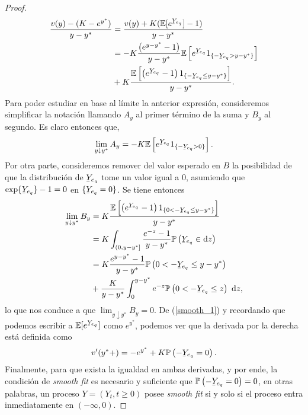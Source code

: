 \begin{proof}
\begin{align}
\frac{v(y) - (K - e^{y^{*}})}{y - y^{*}} & = \frac{v(y) + K(\mathbb{E}[e^{\ubar{Y}_{e_q}}] - 1)}{y - y^{*}} \nonumber \\
	& = - K \frac{\left( e^{y - y^{*}} - 1 \right)}{y - y^{*}} \mathbb{E} \left[ e^{\ubar{Y}_{e_q}} 1_{\{ - \ubar{Y}_{e_q} > y - y^{*}\}} \right] \nonumber \\ 
	& + K \frac{\mathbb{E} \left[ \left( e^{\ubar{Y}_{e_q}} - 1  \right) 1_{\{ - \ubar{Y}_{e_q} \leq y - y^{*}\}} \right]}{y - y^{*}}. \label{smooth_1}
\end{align}
Para poder estudiar en base al límite la anterior expresión, consideremos simplificar la notación llamando $A_y$ al primer término de la suma y $B_y$ al segundo. Es claro entonces que, 
\begin{align*}
\lim_{y \downarrow y^{*}} A_y = - K \mathbb{E} \left[ e^{\ubar{Y}_{e_q}} 1_{\{ - \ubar{Y}_{e_q} > 0\}} \right].
\end{align*}
Por otra parte, consideremos remover del valor esperado en $B$ la posibilidad de que la distribución de $\ubar{Y}_{e_q}$ tome un valor igual a $0$, asumiendo que $\exp \{ \ubar{Y}_{e_q} \} -  1 = 0$ en $\{ \ubar{Y}_{e_q} = 0 \}$. Se tiene entonces
\begin{align*}
\lim_{y \downarrow y^{*}} B_y & = K \frac{\mathbb{E} \left[ \left( e^{\ubar{Y}_{e_q}} - 1  \right) 1_{\{ 0 < - \ubar{Y}_{e_q} \leq y - y^{*}\}} \right]}{y - y^{*}} \\
	& = K \int_{ (0, y - y^{*} ] } \frac{e^{-z} - 1}{y - y^{*}} \mathbb{P} \left( \ubar{Y}_{e_q} \in \text{d}z \right) \\
	& = K \frac{e^{y - y^{*}} - 1}{y - y^{*}} \mathbb{P} \left( 0 < - \ubar{Y}_{e_q} \leq y - y^{*} \right) \\
	& + \frac{K}{y - y^{*}} \int_0^{y - y^{*}} e^{-z} \mathbb{P} \left( 0 < - \ubar{Y}_{e_q} \leq z \right) \text{ d}z,
\end{align*}
lo que nos conduce a que $\lim_{y \downarrow y^{*}} B_y = 0$. De (\ref{smooth_1}) y recordando que podemos escribir a $\mathbb{E}[e^{\ubar{Y}_{e_q}}]$ como $e^{y^{*}}$, podemos ver que la derivada por la derecha está definida como
\begin{align*}
v'(y^{*} + ) = - e^{y^{*}} + K \mathbb{P} \left( - \ubar{Y}_{e_q} = 0 \right).
\end{align*}
Finalmente, para que exista la igualdad en ambas derivadas, y por ende, la condición de \textit{smooth fit} es necesario y suficiente que $\mathbb{P} \left( - \ubar{Y}_{e_q} = 0 \right) = 0$, en otras palabras, un proceso $Y = (Y_t, t \geq 0)$ posee \textit{smooth fit} si y solo si el proceso entra inmediatamente en $(- \infty, 0)$.
\end{proof}

